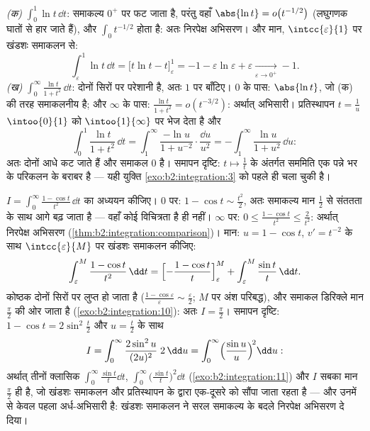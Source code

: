 \begin{example}[दो अभ्यास, अंत तक किए हुए]\label{ex:b2:integration:warmups}
\emph{(क)} $\displaystyle\int_0^1 \ln t\,\dd t$: समाकल्य $0^+$ पर फट जाता है, परंतु वहाँ $\abs{\ln t} = o\bigl(t^{-1/2}\bigr)$ (लघुगणक घातों
से हार जाते हैं), और $\int_0 t^{-1/2}$  होता है: अतः निरपेक्ष अभिसरण। और मान,
$\intcc{\varepsilon}{1}$ पर खंडशः समाकलन से:
\[
\int_\varepsilon^1 \ln t\,\dd t
= \bigl[t\ln t - t\bigr]_\varepsilon^1
= -1 - \varepsilon\ln\varepsilon + \varepsilon
\xrightarrow[\varepsilon\to0^+]{} -1 .
\]
\emph{(ख)} $\displaystyle\int_0^\infty \frac{\ln t}{1 +
t^2}\,\dd t$: दोनों सिरों पर परेशानी है, अतः $1$ पर बाँटिए। $0$ के
पास: $\abs{\ln t}$, जो (क) की तरह समाकलनीय है; और $\infty$ के पास: $\frac{\ln
t}{1+t^2} = o(t^{-3/2})$: अर्थात्
 अभिसारी। प्रतिस्थापन $t = \frac1u$ $\intoo{0}{1}$ को $\intoo{1}{\infty}$ पर भेज देता है
और
\[
\int_0^1 \frac{\ln t}{1+t^2}\,\dd t
= \int_1^{\infty} \frac{-\ln u}{1 + u^{-2}}\cdot
\frac{\dd u}{u^2}
= -\int_1^\infty \frac{\ln u}{1+u^2}\,\dd u :
\]
अतः दोनों आधे कट जाते हैं और समाकल $0$ है। समापन दृष्टि: $t \mapsto \frac1t$ के
अंतर्गत सममिति एक पन्ने भर के परिकलन के बराबर है --- यही युक्ति \cref{exo:b2:integration:3} को
पहले ही चला चुकी है।
\end{example}

\begin{example}[एक मान, तीन समाकल]\label{ex:b2:integration:onecos}
$I = \displaystyle\int_0^{\infty} \frac{1 - \cos
t}{t^2}\,\dd t$ का अध्ययन कीजिए। $0$ पर: $1 - \cos t \sim \frac{t^2}2$, अतः समाकल्य मान $\frac12$ से संततता के साथ
आगे बढ़ जाता है --- वहाँ कोई विचित्रता है ही नहीं। $\infty$ पर: $0 \leq \frac{1 - \cos t}{t^2}
\leq \frac{2}{t^2}$: अर्थात्
निरपेक्ष अभिसरण (\cref{thm:b2:integration:comparison})। मान: $u = 1 - \cos t$, $v' =
t^{-2}$ के साथ $\intcc{\varepsilon}{M}$ पर खंडशः समाकलन कीजिए:
\[
\int_\varepsilon^M \frac{1 - \cos t}{t^2}\,\dd t
= \Bigl[-\frac{1 - \cos t}{t}\Bigr]_\varepsilon^M
+ \int_\varepsilon^M \frac{\sin t}{t}\,\dd t .
\]
कोष्ठक दोनों सिरों पर लुप्त हो जाता है ($\frac{1 -
\cos\varepsilon}{\varepsilon} \sim \frac\varepsilon2$; $M$ पर अंश परिबद्ध), और
समाकल डिरिक्ले मान $\frac\pi2$ की ओर जाता है (\cref{exo:b2:integration:10}): अतः $I = \frac\pi2$। समापन दृष्टि:
$1 - \cos t = 2\sin^2\frac t2$ और $u =
\frac t2$ के साथ
\[
I = \int_0^\infty \frac{2\sin^2 u}{(2u)^2}\;2\,\dd u
= \int_0^\infty \Bigl(\frac{\sin u}{u}\Bigr)^{\!2}\dd u :
\]
अर्थात् तीनों क्लासिक $\int_0^\infty\frac{\sin t}{t}\dd t$, $\int_0^\infty\bigl(\frac{\sin t}{t}\bigr)^2\dd t$ (\cref{exo:b2:integration:11}) और $I$ सबका मान $\frac\pi2$ ही है, जो
खंडशः समाकलन और प्रतिस्थापन के द्वारा एक-दूसरे को सौंपा जाता रहता है ---
और उनमें से केवल पहला अर्ध-अभिसारी है: खंडशः समाकलन ने सरल समाकल्य के
बदले निरपेक्ष अभिसरण दे दिया।
\end{example}

